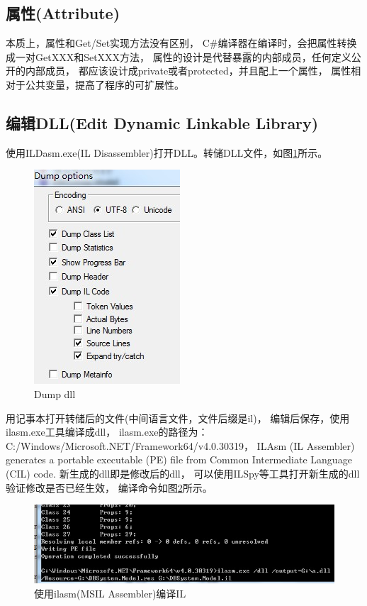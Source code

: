 \documentclass{book}
\begin{document}
\subsection{属性(Attribute)}

本质上，属性和Get/Set实现方法没有区别，
C\#编译器在编译时，会把属性转换成一对GetXXX和SetXXX方法，
属性的设计是代替暴露的内部成员，任何定义公开的内部成员，
都应该设计成private或者protected，并且配上一个属性，
属性相对于公共变量，提高了程序的可扩展性。

\subsection{编辑DLL(Edit Dynamic Linkable Library)}

使用ILDasm.exe(IL Disassembler)打开DLL。转储DLL文件，如图\ref{fig:DumpDllUsingILDasm}所示。

\begin{figure}[htbp]
	\centering
	\includegraphics[scale=0.6]{DumpDllUsingILDasm.jpg}
	\caption{Dump dll}
	\label{fig:DumpDllUsingILDasm}
\end{figure}

用记事本打开转储后的文件(中间语言文件，文件后缀是il)，
编辑后保存，使用ilasm.exe工具编译成dll，
ilasm.exe的路径为：C:/Windows/Microsoft.NET/Framework64/v4.0.30319，
ILAsm (IL Assembler) generates a portable executable (PE) file from Common Intermediate Language (CIL) code.
新生成的dll即是修改后的dll，
可以使用ILSpy等工具打开新生成的dll验证修改是否已经生效，
编译命令如图\ref{fig:CompileDynamicLinkableLib}所示。

\begin{figure}[htbp]
	\centering
	\includegraphics[scale=0.8]{CompileDynamicLinkableLib.jpg}
	\caption{使用ilasm(MSIL Assembler)编译IL}
	\label{fig:CompileDynamicLinkableLib}
\end{figure}
\end{document}
